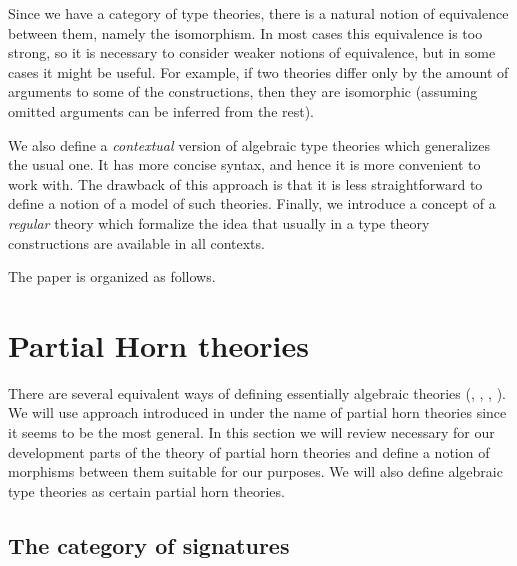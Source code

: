 \documentclass[reqno]{amsart}
\theoremstyle{definition}
\theoremstyle{remark}
\numberwithin{figure}{section}
\begin{document}
Since we have a category of type theories, there is a natural notion of equivalence between them, namely the isomorphism.
In most cases this equivalence is too strong, so it is necessary to consider weaker notions of equivalence, but in some cases it might be useful.
For example, if two theories differ only by the amount of arguments to some of the constructions,
then they are isomorphic (assuming omitted arguments can be inferred from the rest).

We also define a \emph{contextual} version of algebraic type theories which generalizes the usual one.
It has more concise syntax, and hence it is more convenient to work with.
The drawback of this approach is that it is less straightforward to define a notion of a model of such theories.
Finally, we introduce a concept of a \emph{regular} theory which formalize the idea that usually in a type theory constructions are available in all contexts.

The paper is organized as follows.

\begin{comment}
\section{Contextual categories}

Contextual categories were defined by Cartmell \cite{GAT}.
An equivalent definition was given by Voevodsky in \cite{c-systems}.
In this section we will give another equivalent definition which is just a description of models of the initial algebraic type theory as we will see later.
\end{comment}

\section{Partial Horn theories}

There are several equivalent ways of defining essentially algebraic theories (\cite{LPC}, \cite{GAT}, \cite{PHL}, \cite[D 1.3.4]{elephant}).
We will use approach introduced in \cite{PHL} under the name of partial horn theories since it seems to be the most general.
In this section we will review necessary for our development parts of the theory of partial horn theories and define a notion of morphisms between them suitable for our purposes.
We will also define algebraic type theories as certain partial horn theories.

\subsection{The category of signatures}
\end{document}
